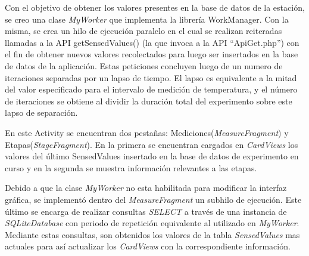              \par Con el objetivo de obtener los valores presentes en la base de datos de la estación, se creo una clase \textit{MyWorker} que implementa la librería WorkManager. Con la misma, se crea un hilo de ejecución paralelo en el cual se realizan reiteradas llamadas a la API getSensedValues() (la que invoca a la API ``ApiGet.php'') con el fin de obtener nuevos valores recolectados para luego ser insertados en la base de datos de la aplicación. Estas peticiones concluyen luego de un numero de iteraciones separadas por un lapso de tiempo. El lapso es equivalente a la mitad del valor especificado para el intervalo de medición de temperatura, y el número de iteraciones se obtiene al dividir la duración total del experimento sobre este lapso de separación.
             
            \par En este Activity se encuentran dos pestañas: Mediciones(\textit{MeasureFragment}) y Etapas(\textit{StageFragment}). En la primera se encuentran cargados en \textit{CardViews} los valores del último SensedValues insertado en la base de datos de experimento en curso y en la segunda se muestra información relevantes a las etapas.
            
            \par Debido a que la clase \textit{MyWorker} no esta habilitada para modificar la interfaz gráfica, se implementó dentro del \textit{MeasureFragment} un subhilo de ejecución. Este último se encarga de realizar consultas \textit{SELECT} a través de una instancia de \textit{SQLiteDatabase} con periodo de repetición equivalente al utilizado en \textit{MyWorker}. Mediante estas consultas, son obtenidos  los valores de la tabla \textit{SensedValues} mas actuales para así actualizar los \textit{CardViews} con la correspondiente información.
            
